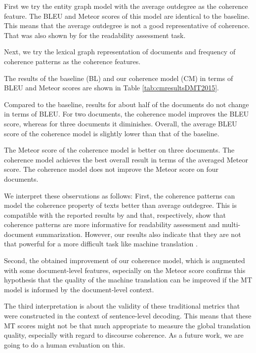 First we try the entity graph model with the average outdegree as the coherence feature. 
The BLEU and Meteor scores of this model are identical to the baseline. 
This means that the average outdegree is not a good representative of coherence. 
That was also shown by  for the readability assessment task.

Next, we try the lexical graph representation of documents and frequency of coherence patterns as the coherence features. 


The results of the baseline (BL) and our coherence model (CM) in terms of BLEU and Meteor scores are shown in Table \ref{tab:cmresultsDMT2015}. 

Compared to the baseline, results for about half of the documents do not change in terms of BLEU. 
For two documents, the coherence model improves the BLEU score, whereas for three documents it diminishes. 
Overall, the average BLEU score of the coherence model is slightly lower than that of the baseline. 

The Meteor score of the coherence model is better on three documents.
The coherence model achieves the best overall result in terms of the averaged Meteor score. 
The coherence model does not improve the Meteor score on four documents.

We interpret these observations as follows:
First, the coherence patterns can model the coherence property of texts better than average outdegree.
This is compatible with the reported results by  and  that, respectively, show that coherence patterns are more informative for readability assessment and multi-document summarization.
However, our results also indicate that they are not that powerful for a more difficult task like machine translation \cite{Smith2016}.

Second, the obtained improvement of our coherence model, which is augmented with some document-level features, especially on the Meteor score confirms this hypothesis that the quality of the machine translation can be improved if the MT model is informed by the document-level context. 

The third interpretation is about the validity of these traditional metrics that were constructed in the context of sentence-level decoding. 
This means that these MT scores might not be that much appropriate to measure the global translation quality, especially with regard to discourse coherence. 
As a future work, we are going to do a human evaluation on this.

